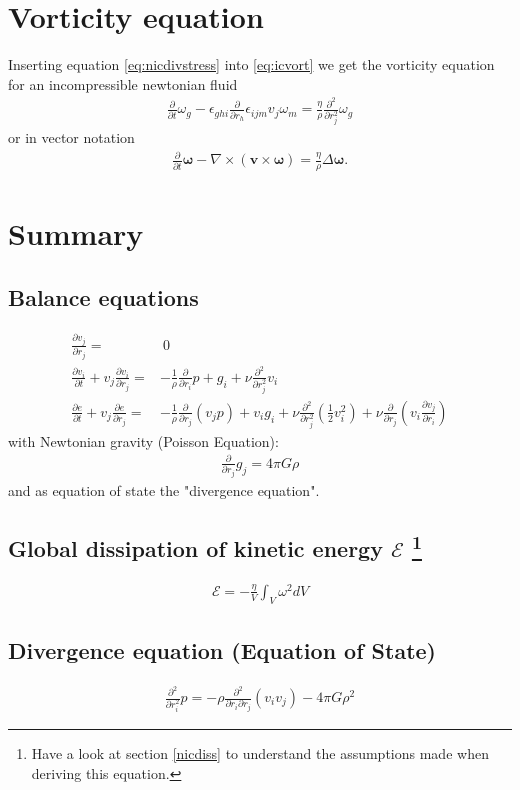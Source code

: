 \documentclass[a4paper,
					12pt,
					twoside,
					openright
					]{book}
\renewcommand{\vec}[1]{\boldsymbol{#1}}
\newcommand{\lra}[1]{{ \left( #1 \right) }}
\newcommand{\pd}[1]{\frac{\partial}{\partial #1}}
\newcommand{\ppd}[2]{\frac{\partial #2}{\partial #1}}
\newcommand{\pdd}[1]{\frac{\partial^2}{\partial #1^2}}
\begin{document}
\section{Vorticity equation}
Inserting equation \eqref{eq:nicdivstress} into \ref{eq:icvort}
we get the vorticity equation for an incompressible newtonian fluid
\begin{align}
\pd{t}\omega_g
-\epsilon_{ghi}\pd{r_h} \epsilon_{ijm} v_j \omega_m =
\frac{\eta}{\rho}\pdd{r_j}\omega_g
\end{align}
or in vector notation
\begin{align}
\pd{t} \vec{\omega}-\nabla \times (\vec{v} \times \vec{\omega}) = 
\frac{\eta}{\rho} \Delta \vec{\omega}.
\end{align}

\section{Summary}

\subsection*{Balance equations}
\begin{align}
\ppd{r_j}{v_j} =&\ 0\\
\ppd{t}{v_i} + v_j \ppd{r_j}{v_i} =& -\frac{1}{\rho}\pd{r_i}p + g_i
+\nu\pdd{r_j}v_i\\
\ppd{t}{e} + v_j \ppd{r_j}{e} =& -\frac{1}{\rho} \pd{r_j}(v_j p) + v_i g_i
+\nu \pdd{r_j}\lra{\frac{1}{2}v_i^2}+ \nu \pd{r_j}\lra{v_i\ppd{r_i}{v_j}}
\end{align}
with Newtonian gravity (Poisson Equation):
\begin{align}
\pd{r_j}g_j=4\pi G \rho
\end{align}
and as equation of state the "divergence equation".

\subsection*{Global dissipation of kinetic energy $\mathcal{E}$ 
\footnote{Have a look at section \ref{nicdiss} to understand the assumptions
made when deriving this equation.}}
\begin{align}
\mathcal{E} = -\frac{\eta}{V} \int_V  \omega^2 dV
\label{eq:nicdiss}
\end{align}

\subsection*{Divergence equation (Equation of State)}
\begin{align}
\pdd{r_i}p= 
-\rho \frac{\partial^2}{\partial r_i \partial r_j}(v_i v_j)
-4\pi G \rho^2
\end{align}
\end{document}
